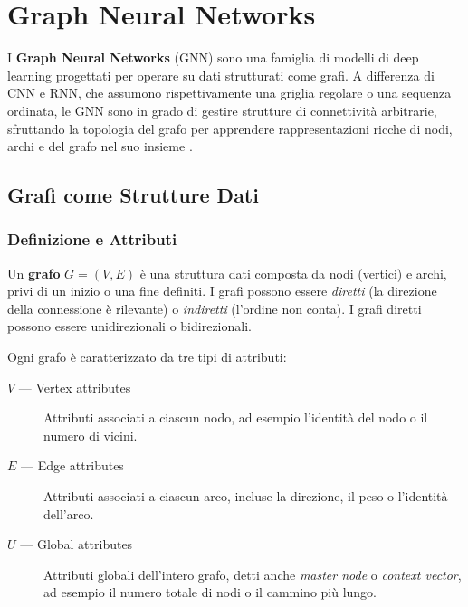 \chapter{Graph Neural Networks}
\label{ch:gnn}

I \textbf{Graph Neural Networks} (GNN) sono una famiglia di modelli di
deep learning progettati per operare su dati strutturati come grafi.
A differenza di CNN e RNN, che assumono rispettivamente una griglia
regolare o una sequenza ordinata, le GNN sono in grado di gestire
strutture di connettività arbitrarie, sfruttando la topologia del
grafo per apprendere rappresentazioni ricche di nodi, archi e del
grafo nel suo insieme \citep{bishop2024}.

\section{Grafi come Strutture Dati}
\label{sec:graphs}

\subsection{Definizione e Attributi}
\label{subsec:graph-def}

Un \textbf{grafo} $G = (V, E)$ è una struttura dati composta da nodi
(vertici) e archi, privi di un inizio o una fine definiti. I grafi
possono essere \emph{diretti} (la direzione della connessione è
rilevante) o \emph{indiretti} (l'ordine non conta). I grafi diretti
possono essere unidirezionali o bidirezionali.

Ogni grafo è caratterizzato da tre tipi di attributi:

\begin{description}
  \item[$V$ — Vertex attributes] Attributi associati a ciascun nodo,
        ad esempio l'identità del nodo o il numero di vicini.
  \item[$E$ — Edge attributes] Attributi associati a ciascun arco,
        incluse la direzione, il peso o l'identità dell'arco.
  \item[$U$ — Global attributes] Attributi globali dell'intero grafo,
        detti anche \emph{master node} o \emph{context vector},
        ad esempio il numero totale di nodi o il cammino più lungo.
\end{description}

